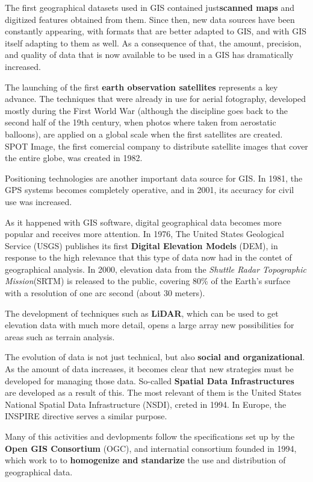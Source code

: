The first geographical datasets used in GIS contained just\textbf{scanned maps} and {digitized features} obtained from them. Since then, new data sources have been constantly appearing, with formats that are better adapted to GIS, and with GIS itself adapting to them as well. As a consequence of that, the amount, precision, and quality of data that is now available to be used in a GIS has dramatically increased.

The launching of the first \textbf{earth observation satellites} represents a key advance. The techniques that were already in use for aerial fotography, developed mostly during the First World War (although the discipline goes back to the second half of the 19th century, when photos where taken from aerostatic balloons), are applied on a global scale when the first satellites are created. SPOT Image, the first comercial company to distribute satellite images that cover the entire globe, was created in 1982.

Positioning technologies are another important data source for GIS. In 1981, the GPS systems becomes completely operative, and in 2001, its accuracy for civil use was increased.

As it happened with GIS software, digital geographical data becomes more popular and receives more attention. In 1976, The United States Geological Service (USGS) publishes its first \textbf{Digital Elevation Models} (DEM), in response to the high relevance that this type of data now had in the contet of geographical analysis. In 2000, elevation data from the \emph{Shuttle Radar Topographic Mission}(SRTM) is released to the public, covering 80\% of the Earth's surface with a resolution of one arc second (about 30 meters).

The development of techniques such as \textbf{LiDAR}, which can be used to get elevation data with much more detail,  opens a large array new possibilities for areas such as terrain analysis.

The evolution of data is not just technical, but also \textbf{social and organizational}. As the amount of data increases, it becomes clear that new strategies must be developed for managing those data. So-called \textbf{Spatial Data Infrastructures} are developed as a result of this. The most relevant of them is the United States National Spatial Data Infrastructure (NSDI), creted in 1994. In Europe, the INSPIRE directive serves a similar purpose.

Many of this activities and devlopments follow the specifications set up by the \textbf{Open GIS Consortium} (OGC), and internatial consortium founded in 1994, which work to to \textbf{homogenize and standarize} the use and distribution of geographical data.

